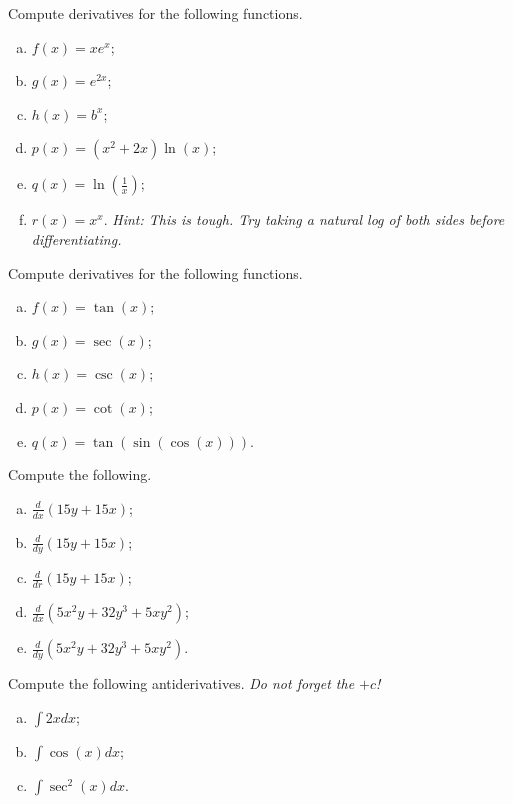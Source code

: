     \begin{problem}
    Compute derivatives for the following functions.
    \begin{enumerate}[(a)]
        \item $f(x)=xe^x$;
        \item $g(x)=e^{2x}$;
        \item $h(x)=b^x$;
        \item $p(x)=(x^2+2x)\ln(x)$;
        \item $q(x)=\ln\left(\frac{1}{x}\right)$;
        \item $r(x)=x^x$. \emph{Hint: This is tough. Try taking a natural log of both sides before differentiating.}
    \end{enumerate}
    \end{problem}

    \begin{problem}
    Compute derivatives for the following functions.
    \begin{enumerate}[(a)]
        \item $f(x)=\tan(x)$;
        \item $g(x)=\sec(x)$;
        \item $h(x)=\csc(x)$;
        \item $p(x)=\cot(x)$;
        \item $q(x)=\tan(\sin(\cos(x)))$.
    \end{enumerate}
    \end{problem}

    \begin{problem}
    Compute the following.
    \begin{enumerate}[(a)]
        \item $\displaystyle{\frac{d}{dx}\left(15y+15x\right)}$;
        \item $\displaystyle{\frac{d}{dy}\left(15y+15x\right)}$;
        \item $\displaystyle{\frac{d}{dr}\left(15y+15x\right)}$;
        \item $\displaystyle{\frac{d}{dx}\left(5x^2y+32y^3+5xy^2\right)}$;
        \item $\displaystyle{\frac{d}{dy}\left(5x^2y+32y^3+5xy^2\right)}$.
    \end{enumerate}
    \end{problem}

    \begin{problem}
    Compute the following antiderivatives. \emph{Do not forget the $+c$!}
    \begin{enumerate}[(a)]
        \item $\displaystyle{\int 2xdx}$;
        \item $\displaystyle{\int \cos(x)dx}$;
        \item $\displaystyle{\int \sec^2(x)dx}$.
    \end{enumerate}
    \end{problem}

